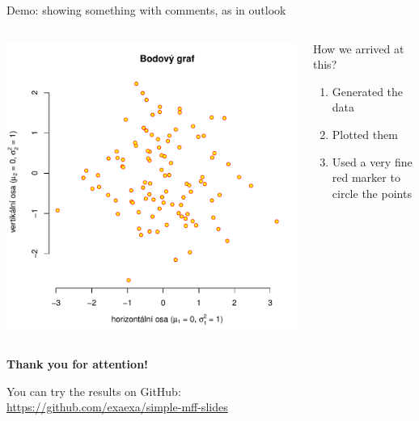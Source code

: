 \documentclass[aspectratio=169]{beamer}
\begin{document}
\begin{frame}{Demo: showing something with comments, as in outlook}
\begin{columns}
\begin{column}{0.5\textwidth}
\includegraphics[width=\linewidth]{img/ukazka-obr01.pdf}
\end{column}
\begin{column}{0.5\textwidth}
How we arrived at this?
\begin{enumerate}
\item Generated the data
\item Plotted them
\item Used a very fine red marker to circle the points
\end{enumerate}
\end{column}
\end{columns}
\end{frame}

\begin{frame}[plain]
\centering
{\Large\bfseries Thank you for attention!}

You can try the results on GitHub: \\
\url{https://github.com/exaexa/simple-mff-slides}

\end{frame}
\end{document}
